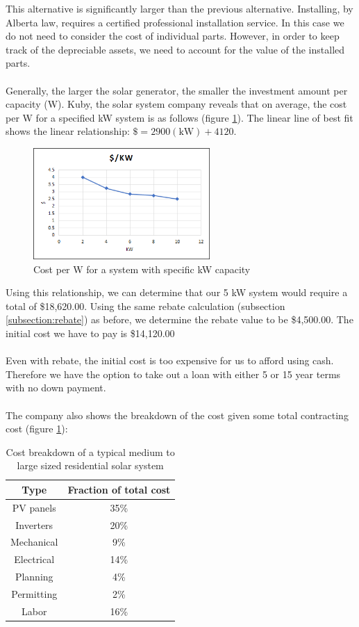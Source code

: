 \documentclass[10pt,letterpaper]{article}
\begin{document}
This alternative is significantly larger than the previous alternative. Installing, by Alberta law, requires a certified professional installation service. In this case we do not need to consider the cost of individual parts. However, in order to keep track of the depreciable assets, we need to account for the value of the installed parts.\\
\\
Generally, the larger the solar generator, the smaller the investment amount per capacity (W). Kuby, the solar system company reveals that on average, the cost per W for a specified kW system is as follows (figure \ref{fig:cost-per-w}).\cite{kuby-costs} The linear line of best fit shows the linear relationship: $\$=2900(\text{kW})+4120$.

\begin{figure}[H]
	\centering
	\includegraphics[width=0.6\textwidth]{assets/1534567923498}
	\caption{Cost per W for a system with specific kW capacity}
	\label{fig:cost-per-w}
\end{figure}

Using this relationship, we can determine that our 5 kW system would require a total of \$18,620.00. Using the same rebate calculation (subsection \ref{subsection:rebate}) as before, we determine the rebate value to be \$4,500.00. The initial cost we have to pay is \$14,120.00\\
\\
Even with rebate, the initial cost is too expensive for us to afford using cash. Therefore we have the option to take out a loan with either 5 or 15 year terms with no down payment.\\
\\

The company also shows the breakdown of the cost given some total contracting cost (figure \ref{fig:cost-breakdown}):

\begin{table}[H]
	\centering
	\begin{tabular}{|c|c|}
		\hline
		Type&Fraction of total cost\\
		\hline
		PV panels&35\%\\
		Inverters&20\%\\
		Mechanical&9\%\\
		Electrical&14\%\\
		Planning&4\%\\
		Permitting&2\%\\
		Labor&16\%\\
		\hline
	\end{tabular}
	\caption{Cost breakdown of a typical medium to large sized residential solar system}
	\label{fig:cost-breakdown}
\end{table}
\end{document}
